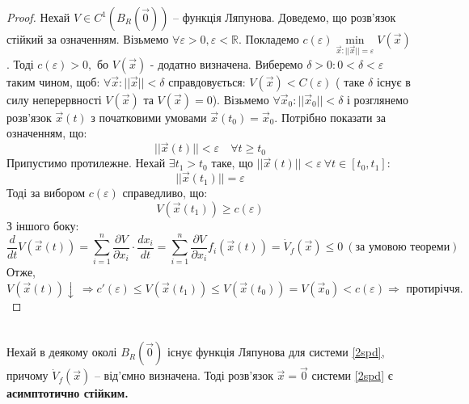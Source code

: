 \documentclass[14pt,a4paper]{scrartcl}
\theoremstyle{definition}
\theoremstyle{definition}
\theoremstyle{definition}
\begin{document}
\begin{proof}
   Нехай $ V \in C^{1} ( B_{R} ( \overrightarrow{0} ))$ -- функція Ляпунова. Доведемо, що розв'язок стійкий за означенням. Візьмемо $ \forall \varepsilon > 0, \varepsilon < \mathbb{R}$. Покладемо $ c( \varepsilon) \min\limits_{\overrightarrow{x} : ||\overrightarrow{x}|| = \varepsilon} V(\overrightarrow{x}) $. Тоді $ c(\varepsilon) > 0, $ бо $ V( \overrightarrow{x}) $ - додатно визначена. Виберемо $ \delta > 0 : 0 < \delta < \varepsilon $ таким чином, щоб: $ \forall \overrightarrow{x}: ||\overrightarrow{x}|| < \delta $ справдовується: $V (\overrightarrow{x}) < C(\varepsilon) $ ( таке $\delta$ існує в силу неперервності $V( \overrightarrow{x})$ та $V ( \overrightarrow{x}) =0 $). Візьмемо $\forall \overrightarrow{x}_0: ||\overrightarrow{x}_0||< \delta $ і розглянемо розв'язок $\overrightarrow{x} (t) $ з початковими умовами $ \overrightarrow{x}(t_0) = \overrightarrow{x}_0$. Потрібно показати за означенням, що:
   $$
   ||\overrightarrow{x}(t)|| < \varepsilon \quad \forall t \geq t_0
   $$
  Припустимо протилежне. Нехай $ \exists t_1 > t_0 $ таке, що $|| \overrightarrow{x}(t) ||< \varepsilon \ \forall t \in [ t_0 , t_1 ]:  $ $$ || \overrightarrow{ x} (t_1) || = \varepsilon$$
  Тоді за вибором $ c ( \varepsilon)$ справедливо, що:
  $$ V(\overrightarrow{x}(t_1)) \geq c(\varepsilon)$$
  З іншого боку:
  $$
  \frac{d}{dt} V(\overrightarrow{x} (t)) =  \sum\limits_{i = 1}^{ n}{ \frac{\partial V}{ \partial x_i } } \cdot \frac{dx_i}{dt} =  \sum\limits_{i = 1}^{n}{ \frac{\partial V}{ \partial x_i } f_i ( \overrightarrow{x} (t))} = \dot{V}_f (\overrightarrow{x}) \leq 0 \  (\text{за умовою теореми})
  $$
  Отже, $V (\overrightarrow{x}(t))\!\! \downarrow \  \!\Rightarrow\!
  c'(\varepsilon) \!\leq\!  V(\overrightarrow{x} (t_1)) \!\leq\! V(\overrightarrow{x} (t_0)) \!=\! V(\overrightarrow{x}_0) \!<\! c(\varepsilon ) \!\Rightarrow\! \text{ протиріччя.}$
\end{proof}
\begin{boxteo}\ \\ Нехай в деякому околі $B_R(\overrightarrow{0})$ існує функція Ляпунова для системи \eqref{2spd}, причому $\dot{V}_f (\overrightarrow{x})$ -- від'ємно визначена.
Тоді розв'язок $\overrightarrow{x} = \overrightarrow{0}$ системи \eqref{2spd} є \textbf{асимптотично стійким.}
\end{boxteo}
\end{document}
